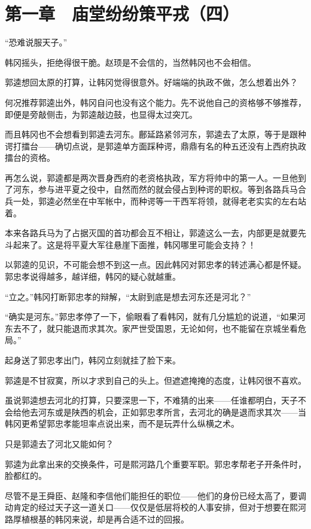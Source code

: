 \section{第一章　庙堂纷纷策平戎（四）}

“恐难说服天子。”

韩冈摇头，拒绝得很干脆。赵顼是不会信的，当然韩冈也不会相信。

郭逵想回太原的打算，让韩冈觉得很意外。好端端的执政不做，怎么想着出外？

何况推荐郭逵出外，韩冈自问也没有这个能力。先不说他自己的资格够不够推荐，即便是旁敲侧击，为郭逵敲边鼓，也显得太过突兀。

而且韩冈也不会想看到郭逵去河东。鄜延路紧邻河东，郭逵去了太原，等于是跟种谔打擂台——确切点说，是郭逵单方面踩种谔，鼎鼎有名的种五还没有上西府执政擂台的资格。

再怎么说，郭逵都是两次晋身西府的老资格执政，军方将帅中的第一人。一旦他到了河东，参与进平夏之役中，自然而然的就会侵占到种谔的职权。等到各路兵马合兵一处，郭逵必然坐在中军帐中，而种谔等一干西军将领，就得老老实实的左右站着。

本来各路兵马为了占据灭国的首功都会互不相让，郭逵这么一去，内部更是就要先斗起来了。这是将平夏大军往悬崖下面推，韩冈哪里可能会支持？！

以郭逵的见识，不可能会想不到这一点。因此韩冈对郭忠孝的转述满心都是怀疑。郭忠孝说得越多，越详细，韩冈的疑心就越重。

“立之。”韩冈打断郭忠孝的辩解，“太尉到底是想去河东还是河北？”

“确实是河东。”郭忠孝停了一下，偷眼看了看韩冈，就有几分尴尬的说道，“如果河东去不了，就只能退而求其次。家严世受国恩，无论如何，也不能留在京城坐看危局。”

起身送了郭忠孝出门，韩冈立刻就挂了脸下来。

郭逵是不甘寂寞，所以才求到自己的头上。但遮遮掩掩的态度，让韩冈很不喜欢。

虽说郭逵想去河北的打算，只要深思一下，不难猜的出来——任谁都明白，天子不会给他去河东或是陕西的机会，正如郭忠孝所言，去河北的确是退而求其次——当韩冈更希望郭忠孝能坦率点说出来，而不是玩弄什么纵横之术。

只是郭逵去了河北又能如何？

郭逵为此拿出来的交换条件，可是熙河路几个重要军职。郭忠孝帮老子开条件时，脸都红的。

尽管不是王舜臣、赵隆和李信他们能担任的职位——他们的身份已经太高了，要调动肯定的经过天子这一道关口——仅仅是低层将校的人事安排，但对于想要在熙河路厚植根基的韩冈来说，却是再合适不过的回报。

